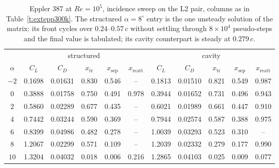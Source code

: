 \begin{table}[H]
  \centering\small
  \caption{Eppler 387 at $Re=10^5$, incidence sweep on the L2 pair, columns as in Table~\ref{t:extepp300k}. The structured $\alpha\!=\!8^\circ$ entry is the one unsteady solution of the matrix: its front cycles over $0.24$--$0.57\,c$ without settling through $8\!\times\!10^4$ pseudo-steps and the final value is tabulated; its cavity counterpart is steady at $0.279\,c$.}
  \label{t:extepp100k}
  \begin{tabular}{c ccccc ccccc}
    \toprule
    & \multicolumn{5}{c}{structured} & \multicolumn{5}{c}{cavity} \\
    \cmidrule(lr){2-6}\cmidrule(lr){7-11}
    $\alpha$ & $C_L$ & $C_D$ & $x_\mathrm{tr}$ & $x_\mathrm{sep}$ & $x_\mathrm{reatt}$
             & $C_L$ & $C_D$ & $x_\mathrm{tr}$ & $x_\mathrm{sep}$ & $x_\mathrm{reatt}$ \\
    \midrule
    $-2$ & 0.1698 & 0.01631 & 0.830 & 0.546 & -- & 0.1813 & 0.01510 & 0.821 & 0.549 & 0.987 \\
    $0$ & 0.3888 & 0.01758 & 0.750 & 0.491 & 0.978 & 0.3944 & 0.01652 & 0.731 & 0.496 & 0.943 \\
    $2$ & 0.5860 & 0.02289 & 0.677 & 0.435 & -- & 0.6021 & 0.01989 & 0.661 & 0.447 & 0.910 \\
    $4$ & 0.7442 & 0.03244 & 0.590 & 0.369 & -- & 0.7944 & 0.02574 & 0.587 & 0.388 & 0.975 \\
    $6$ & 0.8399 & 0.04986 & 0.482 & 0.278 & -- & 1.0039 & 0.03293 & 0.523 & 0.310 & -- \\
    $8$ & 1.2067 & 0.02299 & 0.571 & 0.109 & -- & 1.2039 & 0.02332 & 0.279 & 0.177 & 0.990 \\
    $10$ & 1.3204 & 0.04032 & 0.018 & 0.006 & 0.216 & 1.2865 & 0.04103 & 0.025 & 0.009 & 0.077 \\
    \bottomrule
  \end{tabular}
\end{table}
